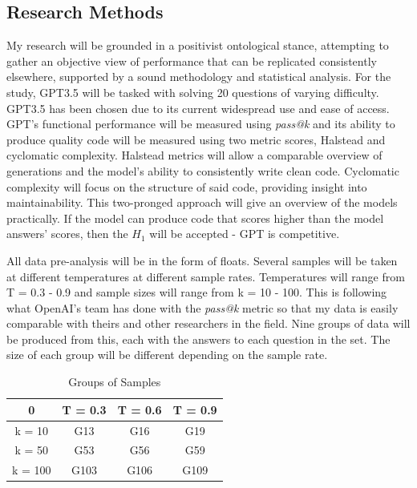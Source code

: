 \documentclass[manuscript,screen,review,sigconf]{acmart}
\begin{document}
\subsection{Research Methods}
My research will be grounded in a positivist ontological stance, attempting to gather an objective view of performance that can be replicated consistently elsewhere, supported by a sound methodology and statistical analysis.
For the study, GPT3.5 will be tasked with solving 20 questions of varying difficulty. GPT3.5 has been chosen due to its current widespread use and ease of access. GPT's functional performance will be measured using \textit{pass@k} and its ability to produce quality code will be measured using two metric scores, Halstead and cyclomatic complexity. Halstead metrics will allow a comparable overview of generations and the model's ability to consistently write clean code. Cyclomatic complexity will focus on the structure of said code, providing insight into maintainability. This two-pronged approach will give an overview of the models practically.
If the model can produce code that scores higher than the model answers' scores, then the \(H_1\) will be accepted - GPT is competitive.

All data pre-analysis will be in the form of floats. Several samples will be taken at different temperatures at different sample rates. Temperatures will range from T = 0.3 - 0.9 and sample sizes will range from k = 10 - 100. This is following what OpenAI's team has done with the \textit{pass@k} metric so that my data is easily comparable with theirs and other researchers in the field. Nine groups of data will be produced from this, each with the answers to each question in the set. The size of each group will be different depending on the sample rate.

\begin{table}[H]
    \centering
    \begin{tabular}{c|c|c|c}
        0 & T = 0.3 & T = 0.6 & T = 0.9\\
        \hline
        k = 10 & G13 & G16 & G19\\
        k = 50 & G53 & G56 & G59\\
        k = 100 & G103 & G106 & G109\\
    \end{tabular}
    \caption{Groups of Samples}
    \label{tab:sampleGroups}
    \vspace{-10mm}
\end{table}
\end{document}
